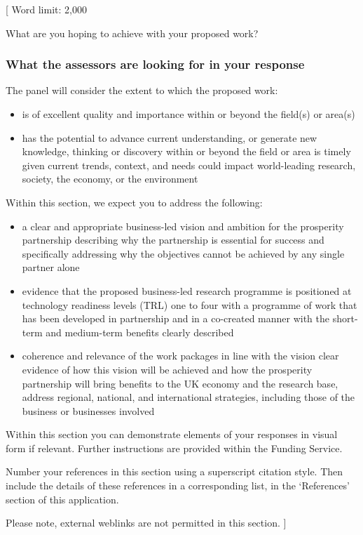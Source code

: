 \documentclass{article}
\newcommand{\desc}[1]{{\leavevmode\color{blue}[#1]}}
\begin{document}
\desc{
Word limit: 2,000

What are you hoping to achieve with your proposed work?

\subsubsection*{What the assessors are looking for in your response}

The panel will consider the extent to which the proposed work:

\begin{itemize}

    \item is of excellent quality and importance within or beyond the field(s) or area(s)
    \item has the potential to advance current understanding, or generate new knowledge,
thinking or discovery within or beyond the field or area
is timely given current trends, context, and needs
could impact world-leading research, society, the economy, or the environment
\end{itemize}

Within this section, we expect you to address the following:

\begin{itemize}

    \item a clear and appropriate business-led vision and ambition for the
        prosperity partnership describing why the partnership is essential for
        success and specifically addressing why the objectives cannot be
        achieved by any single partner alone

    \item evidence that the proposed business-led research programme is
        positioned at technology readiness levels (TRL) one to four with a
        programme of work that has been developed in partnership and in a
        co-created manner with the short-term and medium-term benefits clearly
        described

    \item coherence and relevance of the work packages in line with the vision
        clear evidence of how this vision will be achieved and how the
        prosperity partnership will bring benefits to the UK economy and the
        research base, address regional, national, and international
        strategies, including those of the business or businesses involved

\end{itemize}

Within this section you can demonstrate elements of your responses in visual
form if relevant. Further instructions are provided within the Funding Service.

Number your references in this section using a superscript citation style. Then
include the details of these references in a corresponding list, in the
‘References’ section of this application.

Please note, external weblinks are not permitted in this section.
}
\end{document}
